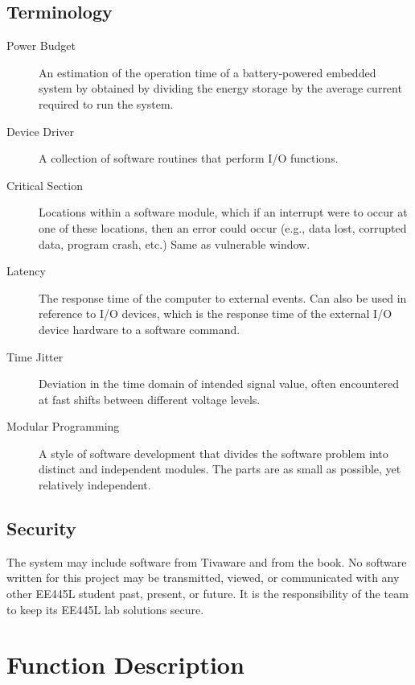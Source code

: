 \documentclass{article}
\begin{document}
	\subsection{Terminology}
		\begin{description}
			\item[Power Budget]
				An estimation of the operation time of a battery-powered embedded system by obtained by dividing the energy storage by the average current required to run the system.
				
			\item[Device Driver]
				A collection of software routines that perform I/O functions.			
			
			\item[Critical Section]
				Locations within a software module, which if an interrupt were to occur at one of these locations, then an error could occur (e.g., data lost, corrupted data, program crash, etc.) Same as vulnerable window.
				
			\item[Latency]
				The response time of the computer to external events. Can also be used in reference to I/O devices, which is the response time of the external I/O device hardware to a software command.
			
			\item[Time Jitter]
				Deviation in the time domain of intended signal value, often encountered at fast shifts between different voltage levels.
			
			\item[Modular Programming]
				A style of software development that divides the software problem into distinct and independent modules. The parts are as small as possible, yet relatively independent. 
			
		\end{description}
	
	\subsection{Security}
		The system may include software from Tivaware and from the book. No software written for this project may be transmitted, viewed, or communicated with any other EE445L student past, present, or future. It is the responsibility of the team to keep its EE445L lab solutions secure.

\section{Function Description}
\end{document}
